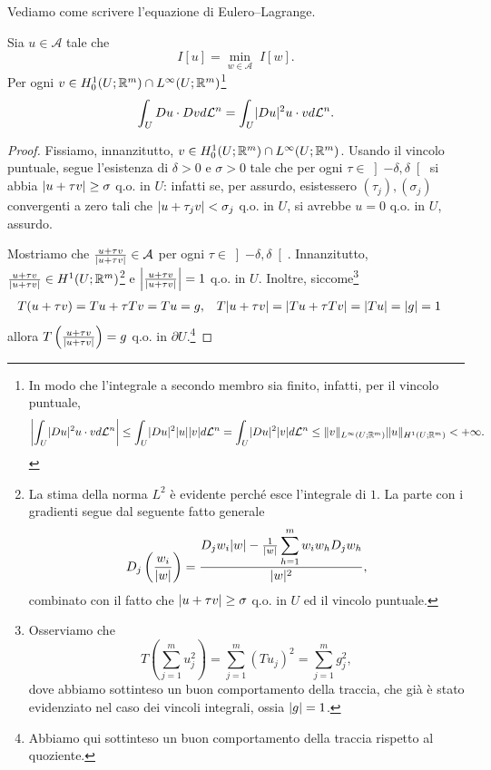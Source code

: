 Vediamo come scrivere l'equazione di Eulero--Lagrange.
\begin{teorema}
Sia $u \in \mathcal{A}$ tale che 
\[ I[u] =  \underset{w \in \mathcal{A}}{\min}\; I[w]. \]
Per ogni $v \in H^1_0(U;\R^m)\cap L^\infty(U;\R^m)$\footnote{In modo che l'integrale a secondo membro sia finito, infatti, per il vincolo puntuale,
\[ \abs*{\int_U \abs{Du}^2u\cdot v d\mathcal{L}^n} \le \int_U\abs{Du}^2\abs{u}\abs{v} d\mathcal{L}^n = \int_U\abs{Du}^2\abs{v} d\mathcal{L}^n \le \norm{v}_{L^\infty(U;\R^m)}\norm{u}_{H^1(U;\R^m)}<+\infty. \]
}
\[ \int_U Du \cdot Dv d\mathcal{L}^n = \int_U \abs{Du}^2u\cdot v d\mathcal{L}^n. \]
\end{teorema}
\begin{proof}
Fissiamo, innanzitutto, $v \in H^1_0(U;\R^m)\cap L^\infty(U;\R^m)$. Usando il vincolo puntuale, segue l'esistenza di $\delta>0$ e $\sigma>0$ tale che per ogni $\tau \in \left] -\delta,\delta\right[ $ si abbia $\abs{u+\tau v}\ge \sigma$ q.o. in $U$: infatti se, per assurdo, esistessero $(\tau_j), (\sigma_j)$ convergenti a zero tali che $\abs{u+\tau_j v} < \sigma_j$ q.o. in $U$, si avrebbe $u = 0$ q.o. in $U$, assurdo.

Mostriamo che $\frac{u+\tau v}{\abs{u+\tau v}} \in \mathcal{A}$ per ogni $\tau \in \left] -\delta,\delta\right[ $. Innanzitutto, $\frac{u+\tau v}{\abs{u+\tau v}} \in H^1(U;\R^m)$\footnote{La stima della norma $L^2$ è evidente perché esce l'integrale di $1$. La parte con i gradienti segue dal seguente fatto generale
	\[ D_j\left( \frac{w_i}{\abs{w}}\right)  = \frac{D_j w_i \abs{w} - \frac{1}{\abs{w}}\displaystyle\sum_{h=1}^m w_iw_hD_j w_h}{\abs{w}^2},   \]
	combinato con il fatto che $\abs{u+\tau v}\ge \sigma$ q.o. in $U$ ed il vincolo puntuale.} e $\abs*{\frac{u+\tau v}{\abs{u+\tau v}}} = 1$ q.o. in $U$. Inoltre, siccome\footnote{Osserviamo che 
	\[ T\left( \sum_{j=1}^{m}u_j^2\right) = \sum_{j=1}^{m}(Tu_j)^2 = \sum_{j=1}^{m} g_j^2, \]
	dove abbiamo sottinteso un buon comportamento della traccia, che già è stato evidenziato nel caso dei vincoli integrali, ossia $\abs{g} = 1$.} 
	\begin{align*}
	T(u+\tau v) &= Tu +\tau Tv = Tu = g, & T\abs{u+\tau v} &= \abs{Tu+\tau Tv} = \abs{Tu} = \abs{g} = 1
	\end{align*}
	allora $T\left( \frac{u+\tau v}{\abs{u+\tau v}}\right)  = g$ q.o. in $\partial U$.\footnote{Abbiamo qui sottinteso un buon comportamento della traccia rispetto al quoziente.}
	

\end{proof}
